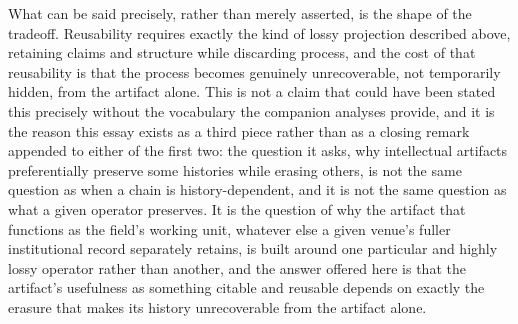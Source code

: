 \documentclass[11pt]{article}
\begin{document}
What can be said precisely, rather than merely asserted, is the shape of the tradeoff. Reusability requires exactly the kind of lossy projection described above, retaining claims and structure while discarding process, and the cost of that reusability is that the process becomes genuinely unrecoverable, not temporarily hidden, from the artifact alone. This is not a claim that could have been stated this precisely without the vocabulary the companion analyses provide, and it is the reason this essay exists as a third piece rather than as a closing remark appended to either of the first two: the question it asks, why intellectual artifacts preferentially preserve some histories while erasing others, is not the same question as when a chain is history-dependent, and it is not the same question as what a given operator preserves. It is the question of why the artifact that functions as the field's working unit, whatever else a given venue's fuller institutional record separately retains, is built around one particular and highly lossy operator rather than another, and the answer offered here is that the artifact's usefulness as something citable and reusable depends on exactly the erasure that makes its history unrecoverable from the artifact alone.
\end{document}

